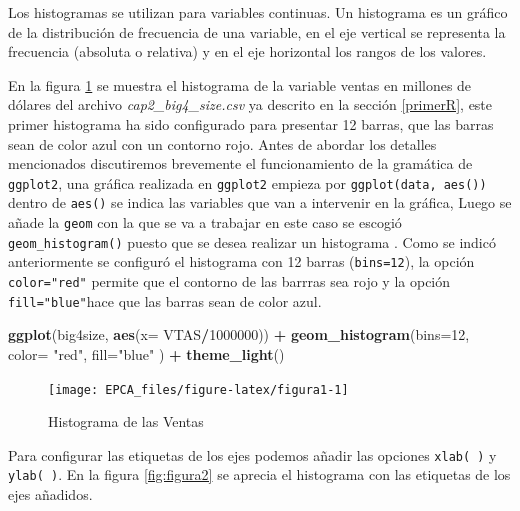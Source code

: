 \documentclass[letterpaper,]{book}
\newenvironment{Shaded}{\begin{snugshade}}{\end{snugshade}}
\newcommand{\DataTypeTok}[1]{\textcolor[rgb]{0.13,0.29,0.53}{#1}}
\newcommand{\DecValTok}[1]{\textcolor[rgb]{0.00,0.00,0.81}{#1}}
\newcommand{\KeywordTok}[1]{\textcolor[rgb]{0.13,0.29,0.53}{\textbf{#1}}}
\newcommand{\NormalTok}[1]{#1}
\newcommand{\OperatorTok}[1]{\textcolor[rgb]{0.81,0.36,0.00}{\textbf{#1}}}
\newcommand{\StringTok}[1]{\textcolor[rgb]{0.31,0.60,0.02}{#1}}
\begin{document}
Los histogramas se utilizan para variables continuas. Un histograma es un gráfico de la distribución de frecuencia de una variable, en el eje vertical se representa la frecuencia (absoluta o relativa) y en el eje horizontal los rangos de los valores.

En la figura \ref{fig:figura1} se muestra el histograma de la variable ventas en millones de dólares del archivo \emph{cap2\_big4\_size.csv} ya descrito en la sección \ref{primerR}, este primer histograma ha sido configurado para presentar 12 barras, que las barras sean de color azul con un contorno rojo. Antes de abordar los detalles mencionados discutiremos brevemente el funcionamiento de la gramática de \texttt{ggplot2}, una gráfica realizada en \texttt{ggplot2} empieza por \texttt{ggplot(data,\ aes())} dentro de \texttt{aes()} se indica las variables que van a intervenir en la gráfica, Luego se añade la \texttt{geom} con la que se va a trabajar en este caso se escogió \texttt{geom\_histogram()} puesto que se desea realizar un histograma \citep{hitchhiker2017}. Como se indicó anteriormente se configuró el histograma con 12 barras (\texttt{bins=12}), la opción \texttt{color="red"} permite que el contorno de las barrras sea rojo y la opción \texttt{fill="blue"}hace que las barras sean de color azul.

\begin{Shaded}
\begin{Highlighting}[]
\KeywordTok{ggplot}\NormalTok{(big4size, }\KeywordTok{aes}\NormalTok{(}\DataTypeTok{x=}\NormalTok{ VTAS}\OperatorTok{/}\DecValTok{1000000}\NormalTok{)) }\OperatorTok{+}\StringTok{ }
\StringTok{  }\KeywordTok{geom_histogram}\NormalTok{(}\DataTypeTok{bins=}\DecValTok{12}\NormalTok{, }\DataTypeTok{color=} \StringTok{"red"}\NormalTok{, }\DataTypeTok{fill=}\StringTok{"blue"}\NormalTok{ ) }\OperatorTok{+}\StringTok{ }
\StringTok{  }\KeywordTok{theme_light}\NormalTok{()}
\end{Highlighting}
\end{Shaded}

\begin{figure}[h!]

{\centering \texttt{[image: EPCA\_files/figure-latex/figura1-1]} 

}

\caption{Histograma de las Ventas}\label{fig:figura1}
\end{figure}

Para configurar las etiquetas de los ejes podemos añadir las opciones \texttt{xlab(\ )} y \texttt{ylab(\ )}. En la figura \ref{fig:figura2} se aprecia el histograma con las etiquetas de los ejes añadidos.
\end{document}
